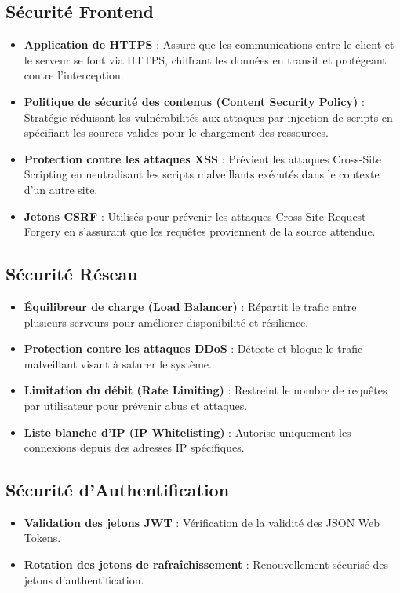 \documentclass{rapportPfe}
\begin{document}
\subsection*{Sécurité Frontend}
\begin{itemize}
  \item \textbf{Application de HTTPS} : Assure que les communications entre le client et le serveur se font via HTTPS, chiffrant les données en transit et protégeant contre l'interception.
  \item \textbf{Politique de sécurité des contenus (Content Security Policy)} : Stratégie réduisant les vulnérabilités aux attaques par injection de scripts en spécifiant les sources valides pour le chargement des ressources.
  \item \textbf{Protection contre les attaques XSS} : Prévient les attaques Cross-Site Scripting en neutralisant les scripts malveillants exécutés dans le contexte d'un autre site.
  \item \textbf{Jetons CSRF} : Utilisés pour prévenir les attaques Cross-Site Request Forgery en s'assurant que les requêtes proviennent de la source attendue.
\end{itemize}

\subsection*{Sécurité Réseau}
\begin{itemize}
  \item \textbf{Équilibreur de charge (Load Balancer)} : Répartit le trafic entre plusieurs serveurs pour améliorer disponibilité et résilience.
  \item \textbf{Protection contre les attaques DDoS} : Détecte et bloque le trafic malveillant visant à saturer le système.
  \item \textbf{Limitation du débit (Rate Limiting)} : Restreint le nombre de requêtes par utilisateur pour prévenir abus et attaques.
  \item \textbf{Liste blanche d'IP (IP Whitelisting)} : Autorise uniquement les connexions depuis des adresses IP spécifiques.
\end{itemize}

\subsection*{Sécurité d'Authentification}
\begin{itemize}
  \item \textbf{Validation des jetons JWT} : Vérification de la validité des JSON Web Tokens.
  \item \textbf{Rotation des jetons de rafraîchissement} : Renouvellement sécurisé des jetons d'authentification.
\end{itemize}
\end{document}
